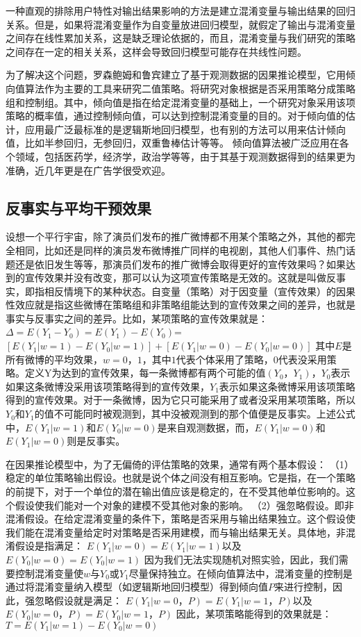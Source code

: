 一种直观的排除用户特性对输出结果影响的方法是建立混淆变量与输出结果的回归关系。但是，如果将混淆变量作为自变量放进回归模型，就假定了输出与混淆变量之间存在线性累加关系，这是缺乏理论依据的，而且，混淆变量与我们研究的策略之间存在一定的相关关系，这样会导致回归模型可能存在共线性问题。

为了解决这个问题，罗森鲍姆和鲁宾建立了基于观测数据的因果推论模型，它用倾向值算法作为主要的工具来研究二值策略。将研究对象根据是否采用策略分成策略组和控制组。其中，倾向值是指在给定混淆变量的基础上，一个研究对象采用该项策略的概率值，通过控制倾向值，可以达到控制混淆变量的目的。对于倾向值的估计，应用最广泛最标准的是逻辑斯地回归模型，也有别的方法可以用来估计倾向值，比如半参回归，无参回归，双重鲁棒估计等等。
倾向值算法被广泛应用在各个领域，包括医药学，经济学，政治学等等，由于其基于观测数据得到的结果更为准确，近几年更是在广告学很受欢迎。

\subsection{反事实与平均干预效果}

设想一个平行宇宙，除了演员们发布的推广微博都不用某个策略之外，其他的都完全相同，比如还是同样的演员发布微博推广同样的电视剧，其他人们事件、热门话题还是依旧发生等等，那演员们发布的推广微博会取得更好的宣传效果吗？如果达到的宣传效果并没有改变，那可以认为这项宣传策略是无效的。这就是叫做反事实，即指相反情境下的某种状态\cite{倾向值匹配与因果推论}。自变量（策略）对于因变量（宣传效果）的因果性效应就是指这些微博在策略组和非策略组能达到的宣传效果之间的差异，也就是事实与反事实之间的差异。比如，某项策略的宣传效果就是：
$\Delta=E(Y_1-Y_0)=E(Y_1)-E(Y_0)$=$[E(Y_1|w=1)-E(Y_0|w=1)]+[E(Y_1|w=0)-E(Y_0|w=0)]$
其中$E$是所有微博的平均效果，$w={0，1}$，其中$1$代表个体采用了策略，$0$代表没采用策略。定义Y为达到的宣传效果，每一条微博都有两个可能的值$(Y_0，Y_1)$，$Y_0$表示如果这条微博没采用该项策略得到的宣传效果，$Y_1$表示如果这条微博采用该项策略得到的宣传效果。对于一条微博，因为它只可能采用了或者没采用某项策略，所以$Y_0$和$Y_1$的值不可能同时被观测到，其中没被观测到的那个值便是反事实。上述公式中，$E(Y_1|w=1)$和$E(Y_0|w=0)$是来自观测数据，而，$E(Y_1|w=0)$和$E(Y_1|w=0)$则是反事实。

在因果推论模型中，为了无偏倚的评估策略的效果，通常有两个基本假设：
（1）稳定的单位策略输出假设。也就是说个体之间没有相互影响。它是指，在一个策略的前提下，对于一个单位的潜在输出值应该是稳定的，在不受其他单位影响的。这个假设使我们能对一个对象的建模不受其他对象的影响。
（2）强忽略假设。即非混淆假设。在给定混淆变量的条件下，策略是否采用与输出结果独立。这个假设使我们能在混淆变量给定时对策略是否采用建模，而与输出结果无关。具体地，非混淆假设是指满足：
$E(Y_1|w=0)=E(Y_1|w=1)$以及$E(Y_0|w=0)=E(Y_0|w=1)$
因为我们无法实现随机对照实验，因此，我们需要控制混淆变量使$w$与$Y_0$或$Y_1$尽量保持独立。在倾向值算法中，混淆变量的控制是通过将混淆变量纳入模型（如逻辑斯地回归模型）得到倾向值$P$来进行控制，因此，强忽略假设就是满足：
$E(Y_1|w=0，P)=E(Y_1|w=1，P)$以及$E(Y_0|w=0，P)=E(Y_0|w=1，P)$
因此，某项策略能得到的效果就是：
$T=E(Y_1|w=1)-E(Y_0|w=0)$




